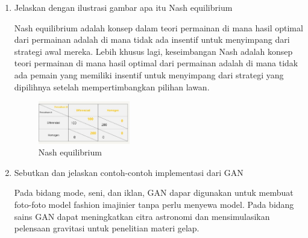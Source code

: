 \begin{enumerate}
            \item Jelaskan dengan ilustrasi gambar apa itu Nash equilibrium
            \par Nash equilibrium adalah konsep dalam teori permainan di mana hasil optimal dari permainan adalah di mana tidak ada insentif untuk menyimpang dari strategi awal mereka. Lebih khusus lagi, keseimbangan Nash adalah konsep teori permainan di mana hasil optimal dari permainan adalah di mana tidak ada pemain yang memiliki insentif untuk menyimpang dari strategi yang dipilihnya setelah mempertimbangkan pilihan lawan.
            \begin{figure}[H]
                \includegraphics[width=4cm]{figures/1174095/chapter8/teori7.jpg}
                \centering
                  \caption{Nash equilibrium}
            \end{figure}

            \item Sebutkan dan jelaskan contoh-contoh implementasi dari GAN
            \par Pada bidang mode, seni, dan iklan, GAN dapar digunakan untuk membuat foto-foto model fashion imajinier tanpa perlu menyewa model. Pada bidang sains GAN dapat meningkatkan citra astronomi dan mensimulasikan pelensaan gravitasi untuk penelitian materi gelap.


\end{enumerate}
